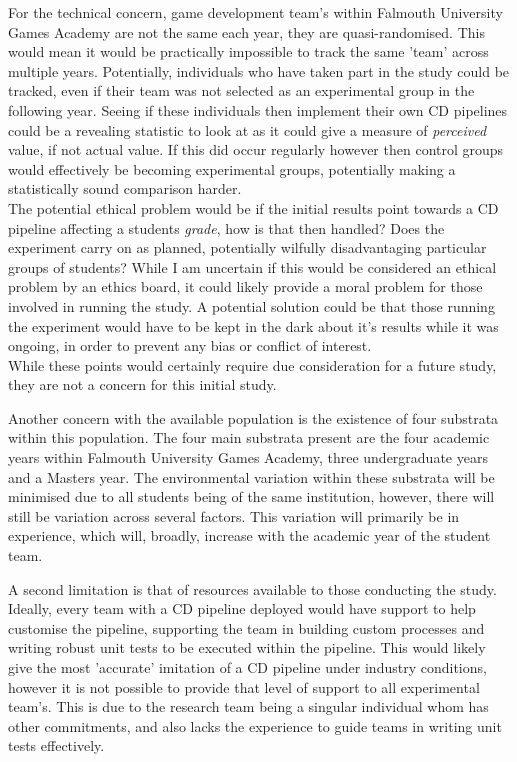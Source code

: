 \documentclass[journal]{IEEEtran}
\begin{document}
For the technical concern, game development team's within Falmouth University Games Academy are not the same each year, they are quasi-randomised. This would mean it would be practically impossible to track the same 'team' across multiple years. Potentially, individuals who have taken part in the study could be tracked, even if their team was not selected as an experimental group in the following year. Seeing if these individuals then implement their own CD pipelines could be a revealing statistic to look at as it could give a measure of \textit{perceived} value, if not actual value. If this did occur regularly however then control groups would effectively be becoming experimental groups, potentially making a statistically sound comparison harder. \\
The potential ethical problem would be if the initial results point towards a CD pipeline affecting a students \textit{grade}, how is that then handled? Does the experiment carry on as planned, potentially wilfully disadvantaging particular groups of students? While I am uncertain if this would be considered an ethical problem by an ethics board, it could likely provide a moral problem for those involved in running the study. A potential solution could be that those running the experiment would have to be kept in the dark about it's results while it was ongoing, in order to prevent any bias or conflict of interest. \\
While these points would certainly require due consideration for a future study, they are not a concern for this initial study.

Another concern with the available population is the existence of four substrata within this population. The four main substrata present are the four academic years within Falmouth University Games Academy, three undergraduate years and a Masters year. The environmental variation within these substrata will be minimised due to all students being of the same institution, however, there will still be variation across several factors. This variation will primarily be in experience, which will, broadly, increase with the academic year of the student team.

A second limitation is that of resources available to those conducting the study. Ideally, every team with a CD pipeline deployed would have support to help customise the pipeline, supporting the team in building custom processes and writing robust unit tests to be executed within the pipeline. This would likely give the most 'accurate' imitation of a CD pipeline under industry conditions, however it is not possible to provide that level of support to all experimental team's. This is due to the research team being a singular individual whom has other commitments, and also lacks the experience to guide teams in writing unit tests effectively.
\end{document}
